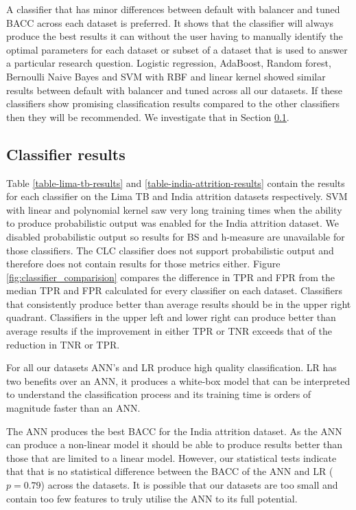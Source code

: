 \documentclass{sig-alternate-05-2015}
\begin{document}
	A classifier that has minor differences between default with balancer and tuned BACC across each dataset is preferred. It shows that the classifier will always produce the best results it can without the user having to manually identify the optimal parameters for each dataset or subset of a dataset that is used to answer a particular research question. Logistic regression, AdaBoost, Random forest, Bernoulli Naive Bayes and SVM with RBF and linear kernel showed similar results between default with balancer and tuned across all our datasets. If these classifiers show promising classification results compared to the other classifiers then they will be recommended. We investigate that in Section \ref{classifier-results}.

	\subsection{Classifier results}
	\label{classifier-results}
	Table \ref{table-lima-tb-results} and \ref{table-india-attrition-results} contain the results for each classifier on the Lima TB and India attrition datasets respectively. SVM with linear and polynomial kernel saw very long training times when the ability to produce probabilistic output was enabled for the India attrition dataset. We disabled probabilistic output so results for BS and h-measure are unavailable for those classifiers. The CLC classifier does not support probabilistic output and therefore does not contain results for those metrics either. Figure \ref{fig:classifier_comparision} compares the difference in TPR and FPR from the median TPR and FPR calculated for every classifier on each dataset. Classifiers that consistently produce better than average results should be in the upper right quadrant. Classifiers in the upper left and lower right can produce better than average results if the improvement in either TPR or TNR exceeds that of the reduction in TNR or TPR. 
	
	For all our datasets ANN's and LR produce high quality classification. LR has two benefits over an ANN, it produces a white-box model that can be interpreted to understand the classification process \cite{Dreiseitl2002352} and its training time is orders of magnitude faster than an ANN.
	 
	The ANN produces the best BACC for the India attrition dataset. As the ANN can produce a non-linear model it should be able to produce results better than those that are limited to a linear model. However, our statistical tests indicate that that is no statistical difference between the BACC of the ANN and LR ($p=0.79$) across the datasets. It is possible that our datasets are too small and contain too few features to truly utilise the ANN to its full potential. 
	
\end{document}
